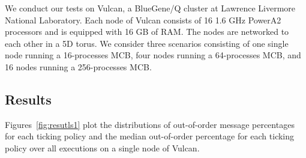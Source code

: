 We conduct our tests on Vulcan, a BlueGene/Q cluster at Lawrence
Livermore National Laboratory. Each node of Vulcan consists of 16 1.6
GHz PowerA2 processors and is equipped with 16 GB of RAM.  The nodes
are networked to each other in a 5D torus. We consider three scenarios
consisting of one single node running a 16-processes MCB, four nodes
running a 64-processes MCB, and 16 nodes running a 256-processes MCB.

\subsection{Results} \label{subsec:results}

Figures~\ref{fig:resutls1} plot the distributions of out-of-order
message percentages for each ticking policy and the median
out-of-order percentage for each ticking policy over all executions on
a single node of Vulcan.
